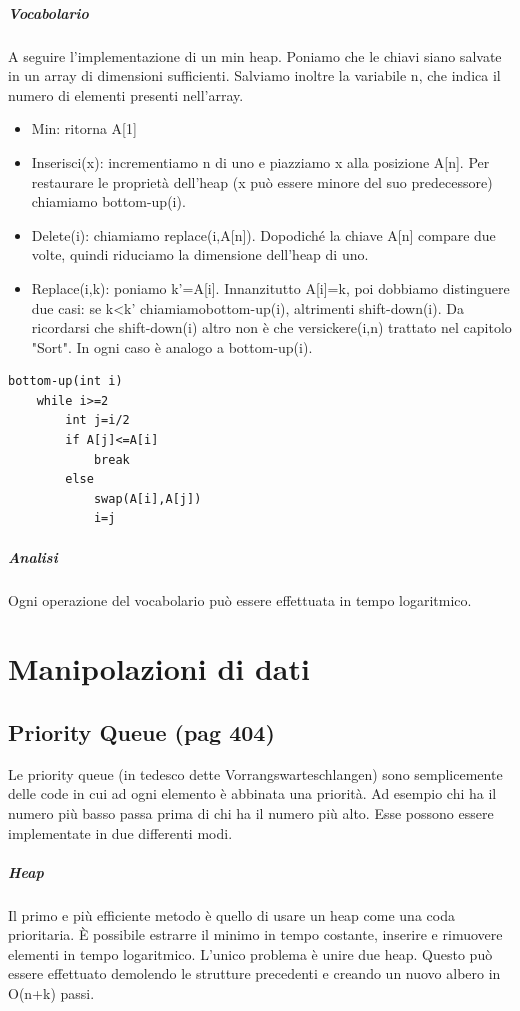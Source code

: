 \documentclass[a4paper]{book}
\begin{document}
\paragraph*{Vocabolario}
A seguire l'implementazione di un min heap. Poniamo che le chiavi siano salvate in un array di dimensioni sufficienti. Salviamo inoltre la variabile n, che indica il numero di elementi presenti nell'array.
\begin{itemize}
\item Min: ritorna A[1]
\item Inserisci(x): incrementiamo n di uno e piazziamo x alla posizione A[n]. Per restaurare le proprietà dell'heap (x può essere minore del suo predecessore) chiamiamo bottom-up(i).
\item Delete(i): chiamiamo replace(i,A[n]). Dopodiché la chiave A[n] compare due volte, quindi riduciamo la dimensione dell'heap di uno. 
\item Replace(i,k): poniamo k'=A[i]. Innanzitutto A[i]=k, poi dobbiamo distinguere due casi: se k<k' chiamiamobottom-up(i), altrimenti shift-down(i). Da ricordarsi che shift-down(i) altro non è che versickere(i,n) trattato nel capitolo "Sort". In ogni caso è analogo a bottom-up(i).
\end{itemize}
\begin{lstlisting}
bottom-up(int i)
	while i>=2
		int j=i/2
		if A[j]<=A[i]
			break
		else
			swap(A[i],A[j])
			i=j	
\end{lstlisting}
\paragraph*{Analisi}
Ogni operazione del vocabolario può essere effettuata in tempo logaritmico.
\chapter{Manipolazioni di dati}
\section{Priority Queue (pag 404)}
Le priority queue (in tedesco dette Vorrangswarteschlangen) sono semplicemente delle code in cui ad ogni elemento è abbinata una priorità. Ad esempio chi ha il numero più basso passa prima di chi ha il numero più alto. Esse possono essere implementate in due differenti modi.
\paragraph*{Heap}
Il primo e più efficiente metodo è quello di usare un heap come una coda prioritaria. È possibile estrarre il minimo in tempo costante, inserire e rimuovere elementi in tempo logaritmico. L'unico problema è unire due heap. Questo può essere effettuato demolendo le strutture precedenti e creando un nuovo albero in O(n+k) passi.
\end{document}
